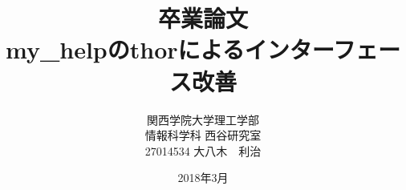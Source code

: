\title{卒業論文\\my\_helpのthorによるインターフェース改善}
\author{関西学院大学理工学部\\情報科学科 西谷研究室\\27014534 大八木　利治}
\date{2018年3月}

\maketitle
\newpage
